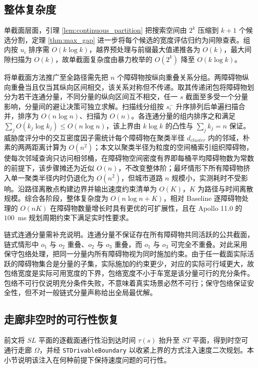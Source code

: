 \documentclass[a4paper,11pt]{ctexart}
\theoremstyle{definition}
\begin{document}
\subsection{整体复杂度}
\label{sec:thy_complexity}

单截面层面，引理 \ref{lem:continuous_partition} 把搜索空间由 $2^k$ 压缩到 $k+1$ 个候选分割，定理 \ref{thm:max_gap} 进一步将每个候选的宽度评估归约为间隙查表。组内按 $u_i$ 排序需 $O(k \log k)$，越界预处理与前缀最大值递推各为 $O(k)$，最大间隙扫描为 $O(k)$，故单截面复杂度由暴力枚举的 $O(2^k)$ 降至 $O(k \log k)$。

将单截面方法推广至全路径需先把 $n$ 个障碍物按纵向重叠关系分组。两障碍物纵向重叠当且仅当其纵向区间相交，该关系对称但不传递。取其传递闭包将障碍物划分为若干连通分量，不同分量的纵向区间互不相交，任一 $s$ 截面至多受一个分量影响，分量间的避让决策可独立求解。扫描线分组按 $s_i^{-}$ 升序排列后单遍扫描合并，排序为 $O(n \log n)$、扫描为 $O(n)$。各连通分量的组内排序之和满足 $\sum_j O(k_j \log k_j) \leq O(n \log n)$，该上界由 $k \log k$ 的凸性与 $\sum_j k_j = n$ 保证。威胁度评分中的交互密度因子需统计每个障碍物在聚类半径 $d_{cluster}$ 内的邻域，朴素的两两距离计算为 $O(n^2)$；本文以聚类半径为粒度的空间桶索引组织障碍物，使每次邻域查询只访问相邻桶，在障碍物空间密度有界即每桶平均障碍物数为常数的前提下，该步骤摊还为近似 $O(n)$，不改变整体阶；最坏情形下所有障碍物挤入单一聚类半径内时仍退化为 $O(n^2)$，但城市道路 $n$ 规模小，实测耗时不受影响。沿路径离散点构建边界并输出速度约束清单为 $O(K)$，$K$ 为路径与时间离散规模。综合各阶段，整体复杂度为 $O(n \log n + K)$，相对 Baseline 逐障碍物处理的 $O(nK)$ 在障碍物数量增长时具有更优的可扩展性，且在 Apollo 11.0 的 $100$~ms 规划周期约束下满足实时性要求。

链式连通分量需补充说明。连通分量不保证存在所有障碍物共同活跃的公共截面，链式情形中 $o_1$ 与 $o_2$ 重叠、$o_2$ 与 $o_3$ 重叠，而 $o_1$ 与 $o_3$ 可完全不重叠。对此采用保守包络处理，把同一分量内所有障碍物视为同时施加约束。由于任一截面实际活跃的障碍物集合是分量的子集，实际施加的约束更少，对应的实际可行域更大，故包络宽度是实际可用宽度的下界，包络宽度不小于车宽是该分量可行的充分条件。包络不可行仅说明充分条件失败，不意味着真实场景必然不可行；保守包络保证安全性，但不对一般链式分量声称给出全局最优解。

\subsection{走廊非空时的可行性恢复}
\label{sec:thy_feasibility}

前文将 $SL$ 平面的逐截面通行性沿到达时间 $\tau(s)$ 抬升至 $ST$ 平面，得到时空可通行走廊 $\Omega$，并经 \texttt{STDrivableBoundary} 以收紧上界的方式注入速度二次规划。本小节说明该注入在何种前提下保持速度问题的可行性。
\end{document}
